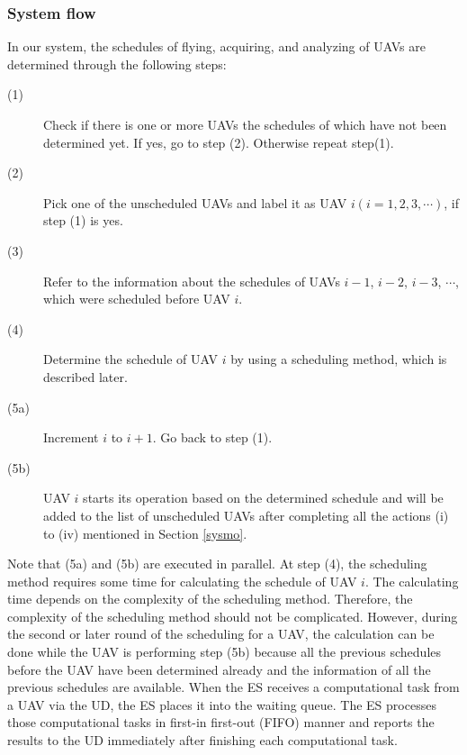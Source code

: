 \documentclass{ieeeaccess}
\begin{document}
\subsubsection{System flow}\label{flow}
In our system, the schedules of flying, acquiring, and analyzing of UAVs are determined through the following steps:
%
\begin{description}
\item[(1)] Check if there is one or more UAVs the schedules of which have not been determined yet. If yes, go to step (2). Otherwise repeat step(1).
\item[(2)] Pick one of the unscheduled UAVs and label it as UAV $i (i=1, 2, 3, \cdots)$, if step (1) is yes.
\item[(3)] Refer to the information about the schedules of UAVs $i-1$, $i-2$, $i-3$, $\cdots$, which were scheduled before UAV $i$.
\item[(4)] Determine the schedule of UAV $i$ by using a scheduling method, which is described later.
\item[(5a)] Increment $i$ to $i+1$. Go back to step (1).
\item[(5b)] UAV $i$ starts its operation based on the determined schedule and will be added to the list of unscheduled UAVs after completing all the actions\hspace{-0.5mm} (i) to (i\hspace{-.1em}v) mentioned in Section \ref{sysmo}.
\end{description}
%
Note that (5a) and (5b) are executed in parallel.
%
At step (4), the scheduling method requires some time for calculating the schedule of UAV $i$.
%
The calculating time depends on the complexity of the scheduling method.
%
Therefore, the complexity of the scheduling method should not be complicated.
%
However, during the second or later round of the scheduling for a UAV, the calculation can be done while the UAV is performing step (5b) because all the previous schedules before the UAV have been determined already and the information of all the previous schedules are available.
%
%
When the ES receives a computational task from a UAV via the UD, the ES places it into the waiting queue. 
The ES processes those computational tasks in first-in first-out (FIFO) manner and reports the results to the UD immediately after finishing each computational task.
\end{document}
